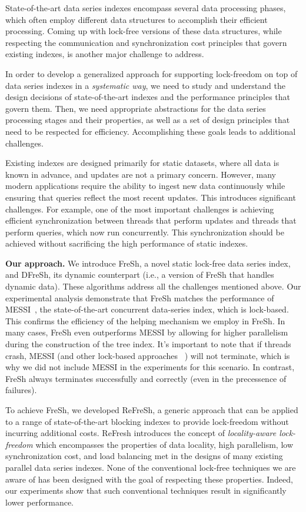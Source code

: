 State-of-the-art data series indexes encompass several data processing phases, 
which often employ different data structures to accomplish their efficient processing. 
Coming up with lock-free versions of these data structures, while respecting
the communication and synchronization cost principles that govern existing 
indexes, is another major challenge to address.

In order to develop a generalized approach for supporting lock-freedom 
on top of data series indexes in a {\em systematic way}, we need to study
and understand the design decisions of state-of-the-art indexes and the performance
principles that govern them. Then, we need appropriate abstractions for the data series
processing stages and their properties, as well as a set of design principles that need
to be respected for efficiency. Accomplishing these goals leads to additional challenges. 

Existing indexes are designed primarily for static datasets, where all data is known in advance,
and updates are not a primary concern. However, many modern applications require the ability to
ingest new data continuously while ensuring that queries reflect the most recent updates.
This introduces significant challenges. For example, one of the most important challenges is
achieving efficient synchronization between threads that perform updates and threads that perform
queries, which now run concurrently. This synchronization should be achieved without sacrificing
the high performance of static indexes.


\noindent
{\bf Our approach.}
We introduce FreSh, a novel static lock-free data series index, and DFreSh, its dynamic
counterpart (i.e., a version of FreSh that handles dynamic data). These algorithms address
all the challenges mentioned above.
Our experimental analysis demonstrate that FreSh matches the performance of 
MESSI~\cite{PFP21-I}, the state-of-the-art concurrent data-series index, which is lock-based. 
This confirms the efficiency of the helping mechanism we employ in FreSh. In many cases, 
FreSh even outperforms MESSI by allowing for higher parallelism during the construction of the
tree index.
It's important to note that if threads crash, MESSI (and other lock-based approaches
~\cite{peng2018paris,PFP21-I,PFP21-II,hercules}) will not terminate, which is 
why we did not include MESSI in the experiments for this scenario. In contrast, 
FreSh always terminates successfully and correctly (even in the precessence of failures).

To achieve FreSh, we developed ReFreSh, a generic approach that can be applied to a
range of state-of-the-art blocking indexes to provide lock-freedom without 
incurring additional costs. 
%
ReFresh introduces the concept of {\em locality-aware lock-freedom} which encompasses
the properties of data locality, high parallelism, low synchronization cost,
and load balancing met in the designs of many existing parallel data series indexes.
None of the conventional lock-free techniques we are aware of has been designed with
the goal of respecting these properties. Indeed, our experiments show that such
conventional techniques result in significantly lower performance.

